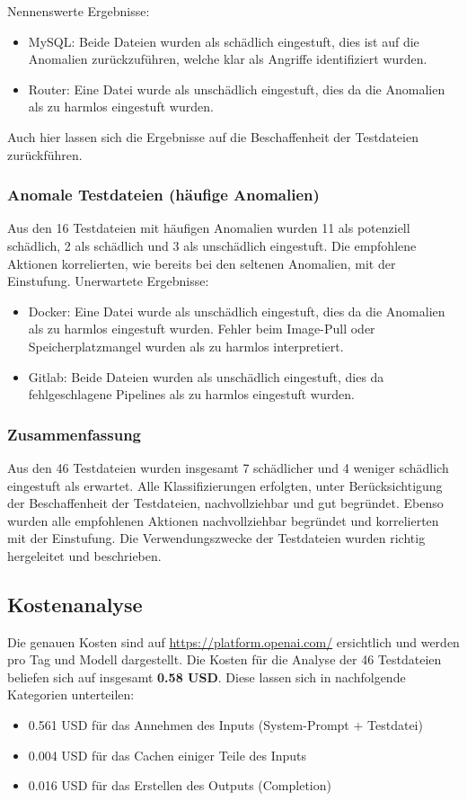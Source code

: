 \documentclass[a4paper,12pt]{report}
\begin{document}
    Nennenswerte Ergebnisse:
    \begin{itemize}
        \item MySQL: Beide Dateien wurden als schädlich eingestuft, dies ist auf die Anomalien zurückzuführen, welche klar als Angriffe identifiziert wurden.
        \item Router: Eine Datei wurde als unschädlich eingestuft, dies da die Anomalien als zu harmlos eingestuft wurden.
    \end{itemize}
    Auch hier lassen sich die Ergebnisse auf die Beschaffenheit der Testdateien zurückführen.

    \subsubsection{Anomale Testdateien (häufige Anomalien)}
    Aus den 16 Testdateien mit häufigen Anomalien wurden 11 als potenziell schädlich, 2 als schädlich und 3 als unschädlich eingestuft.
    Die empfohlene Aktionen korrelierten, wie bereits bei den seltenen Anomalien, mit der Einstufung.
    Unerwartete Ergebnisse:
    \begin{itemize}
        \item Docker: Eine Datei wurde als unschädlich eingestuft, dies da die Anomalien als zu harmlos eingestuft wurden.
        Fehler beim Image-Pull oder Speicherplatzmangel wurden als zu harmlos interpretiert.
        \item Gitlab: Beide Dateien wurden als unschädlich eingestuft, dies da fehlgeschlagene Pipelines als zu harmlos eingestuft wurden.
    \end{itemize}

    \subsubsection{Zusammenfassung}
    Aus den 46 Testdateien wurden insgesamt 7 schädlicher und 4 weniger schädlich eingestuft als erwartet.
    Alle Klassifizierungen erfolgten, unter Berücksichtigung der Beschaffenheit der Testdateien, nachvollziehbar und gut begründet.
    Ebenso wurden alle empfohlenen Aktionen nachvollziehbar begründet und korrelierten mit der Einstufung.
    Die Verwendungszwecke der Testdateien wurden richtig hergeleitet und beschrieben.

    \subsection{Kostenanalyse}\label{subsec:kostenanalyse}
    Die genauen Kosten sind auf \url{https://platform.openai.com/} ersichtlich und werden pro Tag und Modell dargestellt.
    Die Kosten für die Analyse der 46 Testdateien beliefen sich auf insgesamt \textbf{0.58 USD}.
    Diese lassen sich in nachfolgende Kategorien unterteilen:
    \begin{itemize}
        \item 0.561 USD für das Annehmen des Inputs (System-Prompt + Testdatei)
        \item 0.004 USD für das Cachen einiger Teile des Inputs
        \item 0.016 USD für das Erstellen des Outputs (Completion)
    \end{itemize}
\end{document}
